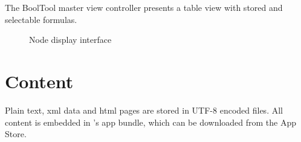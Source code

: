 The BoolTool master view controller presents a table view with stored and selectable formulas.

\begin{figure}[htbp]
\begin{center}
\caption{Node display interface}
\label{fig:NyayaNodeDisplay}
\end{center}
\end{figure}


\section{Content}

Plain text, xml data and html pages are stored in UTF-8 encoded files. 
All content is embedded in \Nyaya's app bundle,
which can be downloaded from the App Store. 



